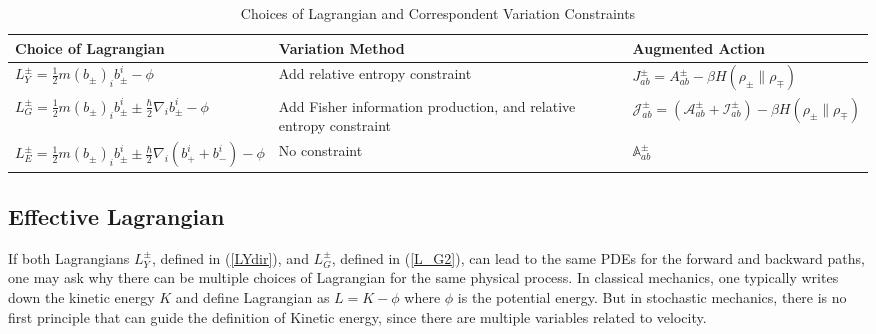 \documentclass[%
 aip, 
 amsmath,amssymb,amsthm,
 nofootinbib,
 reprint,
]{revtex4-1}
\begin{document}
\begin{table*}[ht]
\caption{Choices of Lagrangian and Correspondent Variation Constraints}
\label{tab:1}  
\renewcommand*{\arraystretch}{1.4}
\begin{tabular}{|m{6cm}|m{5cm}|m{5cm}|}
\hline
 \textbf{Choice of Lagrangian} & \textbf{Variation Method} & \textbf{Augmented Action} \\
\hline
$L_Y^{\pm}=\frac{1}{2}m(b_{\pm})_ib_{\pm}^i - \phi$ & Add relative entropy constraint & $J_{ab}^{\pm} = A_{ab}^{\pm} - \beta H(\rho_{\pm}\|\rho_{\mp})$\\ 
\hline
$L_G^{\pm}=\frac{1}{2}m(b_{\pm})_ib_{\pm}^i \pm \frac{\hbar}{2}\nabla_ib_{\pm}^i - \phi$ & Add Fisher information production, and relative entropy constraint & $\mathcal{J}_{ab}^{\pm} = (\mathcal{A}_{ab}^{\pm} +  \mathcal{I}_{ab}^{\pm}) - \beta H(\rho_{\pm}\|\rho_{\mp}) $\\
\hline
$L_E^{\pm}=\frac{1}{2}m(b_{\pm})_ib_{\pm}^i \pm \frac{\hbar}{2}\nabla_i(b_+^i+b_-^i) - \phi$ & No constraint & $\mathbb{A}_{ab}^{\pm}$\\
\hline
\end{tabular}
\end{table*}
\subsection{Effective Lagrangian}
\label{subsec:Lagrangian}
If both Lagrangians $L_Y^{\pm}$, defined in (\ref{LYdir}), and $L_G^{\pm}$, defined in (\ref{L_G2}), can lead to the same PDEs for the forward and backward paths, one may ask why there can be multiple choices of Lagrangian for the same physical process. In classical mechanics, one typically writes down the kinetic energy $K$ and define Lagrangian as $L=K-\phi$ where $\phi$ is the potential energy. But in stochastic mechanics, there is no first principle that can guide the definition of Kinetic energy, since there are multiple variables related to velocity.
\end{document}
